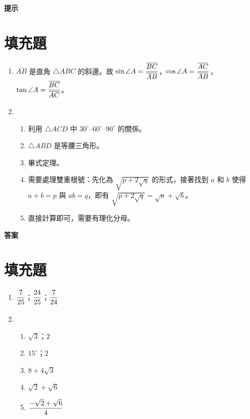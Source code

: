 \documentclass[10pt]{article}
\newcommand*{\fraction}[2]{\rule[-.8\baselineskip]{0pt}{2\baselineskip}\dfrac{#1}{#2}}
\begin{document}
\newpage
\label{hint}
{\bfseries\large 提示 \par}
\setcounter{section}{0}
\section{填充題}
\begin{enumerate}[label=\Alph*.,left=0pt]
  \item $\overline{AB}$ 是直角 $\triangle ABC$ 的斜邊。故 $\sin \angle A = \fraction{\overline{BC}}{\overline{AB}}$，$\cos \angle A = \fraction{\overline{AC}}{\overline{AB}}$，$\tan \angle A = \fraction{\overline{BC}}{\overline{AC}}$。
  \item
  \begin{enumerate}[label=(\arabic*),left=0pt]
    \item 利用 $\triangle ACD$ 中 $30^\circ$–$60^\circ$–$90^\circ$ 的關係。
    \item $\triangle ABD$ 是等腰三角形。
    \item 畢式定理。
    \item 需要處理雙重根號：先化為 $\sqrt{p+2\sqrt{q}}$ 的形式，接著找到 $a$ 和 $b$ 使得 $a+b=p$ 與 $ab=q$，即有 $\sqrt{p+2\sqrt{q}} = \sqrt{a} + \sqrt{b}$。
    \item 直接計算即可，需要有理化分母。
  \end{enumerate}
\end{enumerate}

\newpage
\label{answer}
{\bfseries\large 答案 \par}
\setcounter{section}{0}
\section{填充題}
\begin{enumerate}[label=\Alph*.,left=0pt]
  \item $\fraction{7}{25}$；$\fraction{24}{25}$；$\fraction{7}{24}$
  \item
  \begin{enumerate}[label=(\arabic*),left=0pt]
    \item $\sqrt{3}$；$2$
    \item $15^\circ$；$2$
    \item $8+4\sqrt{3}$
    \item $\sqrt{2}+\sqrt{6}$
    \item $\fraction{-\sqrt{2}+\sqrt{6}}{4}$
  \end{enumerate}
\end{enumerate}
\end{document}
